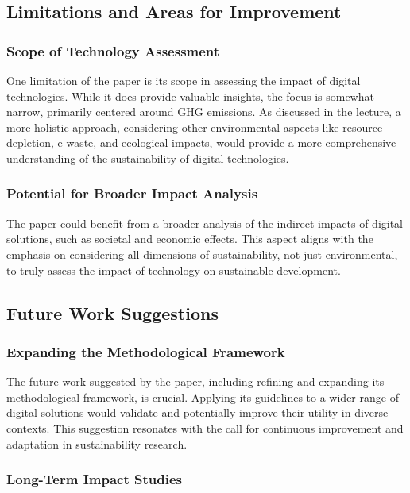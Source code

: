 \documentclass[conference,compsoc]{IEEEtran}
\begin{document}
\subsection{Limitations and Areas for Improvement}

\subsubsection{Scope of Technology Assessment}

One limitation of the paper is its scope in assessing the impact of digital technologies. While it does provide valuable insights, the focus is somewhat narrow, primarily centered around GHG emissions. As discussed in the lecture, a more holistic approach, considering other environmental aspects like resource depletion, e-waste, and ecological impacts, would provide a more comprehensive understanding of the sustainability of digital technologies.

\subsubsection{Potential for Broader Impact Analysis}

The paper could benefit from a broader analysis of the indirect impacts of digital solutions, such as societal and economic effects. This aspect aligns with the  emphasis on considering all dimensions of sustainability, not just environmental, to truly assess the impact of technology on sustainable development.

\subsection{Future Work Suggestions}

\subsubsection{Expanding the Methodological Framework}

The future work suggested by the paper, including refining and expanding its methodological framework, is crucial. Applying its guidelines to a wider range of digital solutions would validate and potentially improve their utility in diverse contexts. This suggestion resonates with the  call for continuous improvement and adaptation in sustainability research.

\subsubsection{Long-Term Impact Studies}
\end{document}
